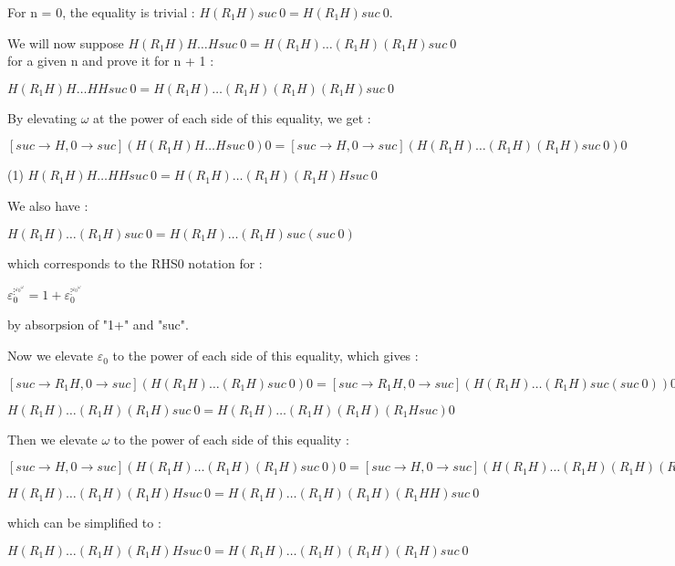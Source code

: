 \documentclass[10pt]{article}
\begin{document}
For n = 0, the equality is trivial : \( H (R_1 H) suc\ 0 = H (R_1 H) suc\ 0 \).

\bigskip

We will now suppose \( H (R_1 H) H \ldots H suc\ 0 = H (R_1 H) \ldots (R_1 H) (R_1 H) suc\ 0 \) for a given n and prove it for n + 1 :

\( H (R_1 H) H \ldots H H suc\ 0 = H (R_1 H) \ldots (R_1 H) (R_1 H) (R_1 H) suc\ 0  \)

\bigskip

By elevating \( \omega \) at the power of each side of this equality, we get : 

\( [suc \rightarrow H, 0 \rightarrow suc] (H (R_1 H) H \ldots H suc\ 0) 0 = [suc \rightarrow H, 0 \rightarrow suc] (H (R_1 H) \ldots (R_1 H) (R_1 H) suc\ 0) 0 \)

(1) \( H (R_1 H) H \ldots H H suc\ 0 = H (R_1 H) \ldots (R_1 H) (R_1 H) H suc\ 0 \)

\bigskip

We also have :

\( H (R_1 H) \ldots (R_1 H) suc\ 0 = H (R_1 H) \ldots (R_1 H) suc (suc\ 0) \)

which corresponds to the RHS0 notation for :

\( \varepsilon_0^{\vdots^{{\varepsilon_0}^\omega}} = 1 + \varepsilon_0^{\vdots^{{\varepsilon_0}^\omega}} \)

by absorpsion of "1+" and "suc".

Now we elevate \( \varepsilon_0 \) to the power of each side of this equality, which gives :

\( [suc \rightarrow R_1 H, 0 \rightarrow suc] (H (R_1 H) \ldots (R_1 H) suc\ 0) 0 = [suc \rightarrow R_1 H, 0 \rightarrow suc] (H (R_1 H) \ldots (R_1 H) suc (suc\ 0)) 0 \)

\( H (R_1 H) \ldots (R_1 H) (R_1 H) suc\ 0 = H (R_1 H) \ldots (R_1 H) (R_1 H) (R_1 H suc) 0 \)

Then we elevate \( \omega \) to the power of each side of this equality :

\( [suc \rightarrow H, 0 \rightarrow suc] (H (R_1 H) \ldots (R_1 H) (R_1 H) suc\ 0) 0 = [suc \rightarrow H, 0 \rightarrow suc] (H (R_1 H) \ldots (R_1 H) (R_1 H) (R_1 H suc) 0) 0 \)

\( H (R_1 H) \ldots (R_1 H) (R_1 H) H suc\ 0 = H (R_1 H) \ldots (R_1 H) (R_1 H) (R_1 H H) suc\ 0 \)

which can be simplified to :

\( H (R_1 H) \ldots (R_1 H) (R_1 H) H suc\ 0 = H (R_1 H) \ldots (R_1 H) (R_1 H) (R_1 H) suc\ 0 \)
\end{document}

